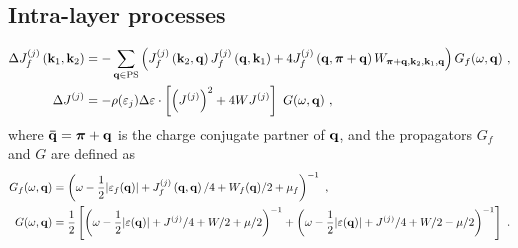\documentclass[%
reprint,
superscriptaddress,
groupedaddress,
superscriptaddress,
onecolumn,
]{revtex4-2}
\begin{document}
\subsection{Intra-layer processes}
\begin{equation}\begin{aligned}
	\Delta J_f^{(j)}\left({\bf k}_1, {\bf k}_2\right) &= -\sum_{{\bf q} \in \text{PS}} \left(J_f^{(j)}\left({\bf k}_2,{\bf q}\right) J_f^{(j)}\left({\bf q},{\bf k}_1\right) + 4J_f^{(j)}\left({\bf q}, {\boldsymbol \pi} + {\bf q}\right) W_{{\boldsymbol \pi} + {\bf q}, {\bf k}_2, {\bf k}_1, {\bf q}}\right) G_f(\omega, {\bf q})~,\\
	\Delta J^{(j)} &= - \rho(\varepsilon_j)\Delta \varepsilon\cdot\left[\left(J^{(j)}\right)^2 + 4WJ^{(j)}\right]~G(\omega, {\bf q})~,
\end{aligned}\end{equation}
where \({\bf \bar q} = {\boldsymbol \pi} + {\bf q}\) is the charge conjugate partner of \({\bf q}\), and the propagators \(G_f\) and \(G\) are defined as
\begin{equation}\begin{aligned}\label{propagators}
	G_f(\omega,{\bf q}) &= \left(\omega - \frac{1}{2}|\varepsilon_f({\bf q})| + J^{(j)}_f\left({\bf q},{\bf q}\right)/4 + W_f({\bf q})/2 + \mu_f\right)^{-1} ~,\\
	G(\omega,{\bf q}) &= \frac{1}{2}\left[\left(\omega - \frac{1}{2}|\varepsilon({\bf q})| + J^{(j)}/4 + W/2 + \mu/2\right)^{-1} + \left(\omega - \frac{1}{2}|\varepsilon({\bf q})| + J^{(j)}/4 + W/2 - \mu/2\right)^{-1}\right] ~.
\end{aligned}\end{equation}
\end{document}
